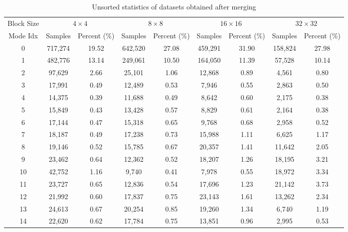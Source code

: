 \begin{table}[H]
    \caption{Unsorted statistics of datasets obtained after merging}
    \bigskip\label{tab:unsorted-distribution-after-first-step}
    \centering
    \resizebox{\textwidth}{!}
    {\begin{tabular}{c c c c c c c c c}
        \toprule
        Block Size & \multicolumn{2}{c}{\(4\times4\)} & \multicolumn{2}{c}{\(8\times8\)} & \multicolumn{2}{c}{\(16\times16\)} & \multicolumn{2}{c}{\(32\times32\)} \\
        Mode Idx & Samples & Percent (\%) & Samples & Percent (\%) & Samples & Percent (\%) & Samples & Percent (\%)\\
        \midrule
        0 & 717,274 & 19.52 & 642,520 & 27.08 & 459,291 & 31.90 & 158,824 & 27.98 \\ 
        1 & 482,776 & 13.14 & 249,061 & 10.50 & 164,050 & 11.39 & 57,528 & 10.14 \\ 
        2 & 97,629 &  2.66 & 25,101 &  1.06 & 12,868 &  0.89 & 4,561 &  0.80 \\ 
        3 & 17,991 &  0.49 & 12,489 &  0.53 & 7,946 &  0.55 & 2,863 &  0.50 \\ 
        4 & 14,375 &  0.39 & 11,688 &  0.49 & 8,642 &  0.60 & 2,175 &  0.38 \\ 
        5 & 15,849 &  0.43 & 13,428 &  0.57 & 8,829 &  0.61 & 2,164 &  0.38 \\ 
        6 & 17,144 &  0.47 & 15,318 &  0.65 & 9,768 &  0.68 & 2,958 &  0.52 \\ 
        7 & 18,187 &  0.49 & 17,238 &  0.73 & 15,988 &  1.11 & 6,625 &  1.17 \\ 
        8 & 19,146 &  0.52 & 15,785 &  0.67 & 20,357 &  1.41 & 11,642 &  2.05 \\ 
        9 & 23,462 &  0.64 & 12,362 &  0.52 & 18,207 &  1.26 & 18,195 &  3.21 \\ 
       10 & 42,752 &  1.16 & 9,740 &  0.41 & 7,978 &  0.55 & 18,972 &  3.34 \\ 
       11 & 23,727 &  0.65 & 12,836 &  0.54 & 17,696 &  1.23 & 21,142 &  3.73 \\ 
       12 & 21,992 &  0.60 & 17,837 &  0.75 & 23,143 &  1.61 & 13,262 &  2.34 \\ 
       13 & 24,613 &  0.67 & 20,254 &  0.85 & 19,260 &  1.34 & 6,740 &  1.19 \\ 
       14 & 22,620 &  0.62 & 17,784 &  0.75 & 13,851 &  0.96 & 2,995 &  0.53 \\ 

\end{tabular}}
\end{table}
